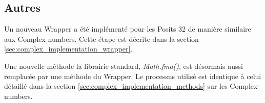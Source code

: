 \subsection{Autres}

Un nouveau \gls{Wrapper} a été implémenté pour les \glspl{Posit} 32 de manière similaire aux \glspl{Complex-number}. Cette étape est décrite dans la section \ref{sec:complex_implementation_wrapper}.

Une nouvelle méthode la librairie standard, \textit{Math.fma()}, est désormais aussi remplacée par une méthode du \gls{Wrapper}. Le processus utilisé est identique à celui détaillé dans la section \ref{sec:complex_implementation_methods} sur les \glspl{Complex-number}.

